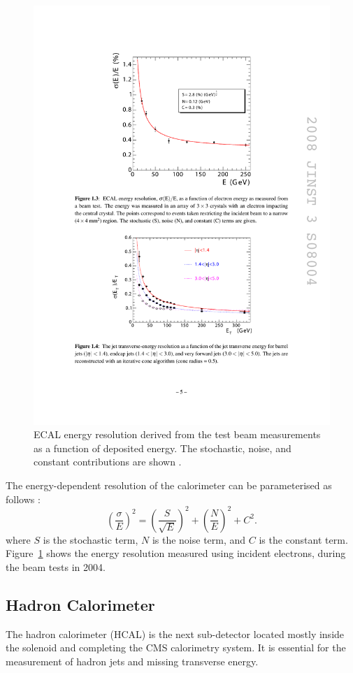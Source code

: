 \begin{figure}[htbp]
  \centering
  \leavevmode
  \includegraphics[width=0.7\columnwidth]{ECAL_resolution}
  \caption{ECAL energy resolution derived from the test beam measurements as a function of deposited energy. The
  stochastic, noise, and constant contributions are shown \autocite{CMS}.}
  \label{fig:ECAL_resolution}
\end{figure}

The energy-dependent resolution of the calorimeter can be parameterised as follows \autocite{CMS}:
\begin{equation}
  \left(\frac{\sigma}{E}\right)^2 = \left(\frac{S}{\sqrt E}\right)^2 + \left(\frac{N}{E}\right)^2 + C^2.
\end{equation}
where $S$ is the stochastic term, $N$ is the noise term, and $C$ is the constant term. Figure~\ref{fig:ECAL_resolution}
shows the energy resolution measured using incident electrons, during the beam tests in 2004.

\subsection{Hadron Calorimeter}

The hadron calorimeter (HCAL) is the next sub-detector located mostly inside the solenoid and completing the CMS
calorimetry system. It is essential for the measurement of hadron jets and missing transverse energy.

